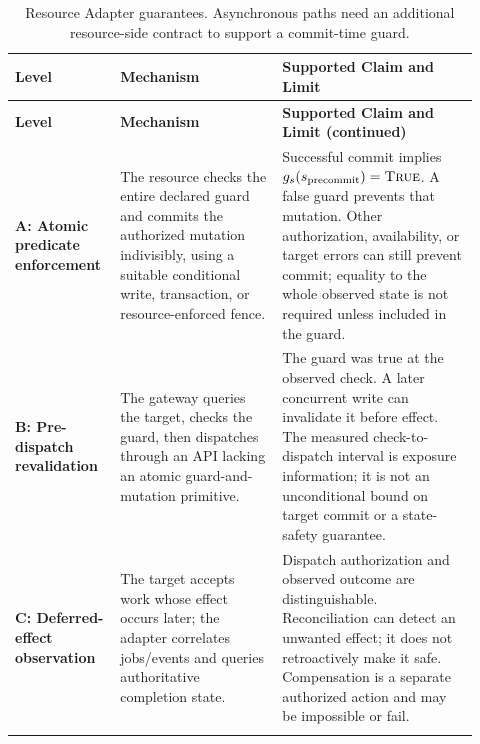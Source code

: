 \small
\begin{longtable}{L{0.19\linewidth}L{0.33\linewidth}L{0.40\linewidth}}
\toprule
\textbf{Level} & \textbf{Mechanism} & \textbf{Supported Claim and Limit}\\
\midrule
\endfirsthead
\toprule
\textbf{Level} & \textbf{Mechanism} & \textbf{Supported Claim and Limit (continued)}\\
\midrule
\endhead
\textbf{A: Atomic predicate enforcement} & The resource checks the entire declared guard and commits the authorized mutation indivisibly, using a suitable conditional write, transaction, or resource-enforced fence. & Successful commit implies $g_s(s_{\mathrm{precommit}})=\textsc{True}$. A false guard prevents that mutation. Other authorization, availability, or target errors can still prevent commit; equality to the whole observed state is not required unless included in the guard.\\
\textbf{B: Pre-dispatch revalidation} & The gateway queries the target, checks the guard, then dispatches through an API lacking an atomic guard-and-mutation primitive. & The guard was true at the observed check. A later concurrent write can invalidate it before effect. The measured check-to-dispatch interval is exposure information; it is not an unconditional bound on target commit or a state-safety guarantee.\\
\textbf{C: Deferred-effect observation} & The target accepts work whose effect occurs later; the adapter correlates jobs/events and queries authoritative completion state. & Dispatch authorization and observed outcome are distinguishable. Reconciliation can detect an unwanted effect; it does not retroactively make it safe. Compensation is a separate authorized action and may be impossible or fail.\\
\bottomrule
\caption{Resource Adapter guarantees. Asynchronous paths need an additional resource-side contract to support a commit-time guard.}
\label{fig:adapter-levels}
\end{longtable}
\normalsize


